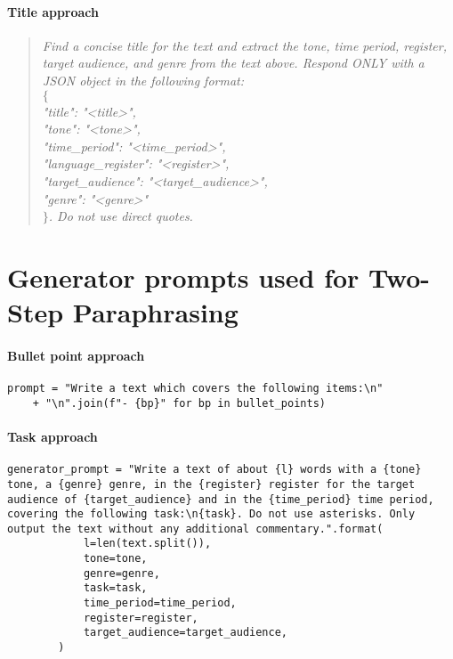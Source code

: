 \paragraph{Title approach}
\begin{quote}
\textit{
Find a concise title for the text and extract the tone, time period, register, target audience, and genre from the text above. 
Respond ONLY with a JSON object in the following format: \\
$\{$ \\
\hspace{1em}"title": "<title>", \\
\hspace{1em}"tone": "<tone>", \\
\hspace{1em}"time\_period": "<time\_period>", \\
\hspace{1em}"language\_register": "<register>", \\
\hspace{1em}"target\_audience": "<target\_audience>", \\
\hspace{1em}"genre": "<genre>" \\
$\}$. 
Do not use direct quotes.
}
\end{quote}


\section{Generator prompts used for Two-Step Paraphrasing}
\label{app:generator_prompts}

\paragraph{Bullet point approach}
\begin{verbatim}
prompt = "Write a text which covers the following items:\n" 
    + "\n".join(f"- {bp}" for bp in bullet_points)
\end{verbatim}

\paragraph{Task approach}
\begin{verbatim}
generator_prompt = "Write a text of about {l} words with a {tone} tone, a {genre} genre, in the {register} register for the target audience of {target_audience} and in the {time_period} time period, covering the following task:\n{task}. Do not use asterisks. Only output the text without any additional commentary.".format(
            l=len(text.split()),
            tone=tone,
            genre=genre,
            task=task,
            time_period=time_period,
            register=register,
            target_audience=target_audience,
        )
\end{verbatim}

